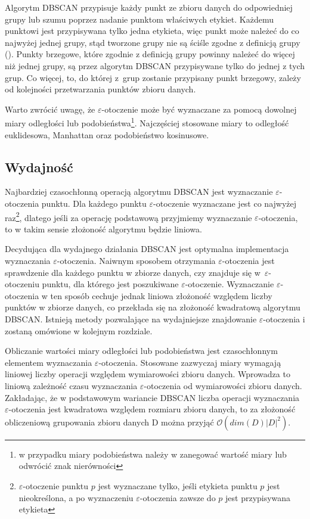 Algorytm DBSCAN przypisuje każdy punkt ze zbioru danych do odpowiedniej grupy lub szumu poprzez nadanie punktom właściwych etykiet. Każdemu punktowi jest przypisywana tylko jedna etykieta, więc punkt może należeć do co najwyżej jednej grupy, stąd tworzone grupy nie są ściśle zgodne z definicją grupy (). Punkty brzegowe, które zgodnie z definicją grupy powinny należeć do więcej niż jednej grupy, są przez algorytm DBSCAN przypisywane tylko do jednej z tych grup. Co więcej, to, do której \mbox{z grup} zostanie przypisany punkt brzegowy, zależy od kolejności przetwarzania punktów zbioru danych.

Warto zwrócić uwagę, że $ \varepsilon $-otoczenie może być wyznaczane za pomocą dowolnej miary odległości lub podobieństwa\footnote{w przypadku miary podobieństwa należy w  zanegować wartość miary lub odwrócić znak nierówności}. Najczęściej stosowane miary to odległość euklidesowa, Manhattan oraz podobieństwo kosinusowe.



\subsection{Wydajność}
Najbardziej czasochłonną operacją algorytmu DBSCAN jest wyznaczanie $ \varepsilon $-otoczenia punktu. Dla każdego punktu $ \varepsilon $-otoczenie wyznaczane jest co najwyżej raz\footnote{$ \varepsilon $-otoczenie punktu $ p $ jest wyznaczane tylko, jeśli etykieta punktu $ p $ jest nieokreślona, a  po wyznaczeniu $ \varepsilon $-otoczenia zawsze do $ p $ jest przypisywana etykieta}, dlatego jeśli za operację podstawową przyjmiemy wyznaczanie $ \varepsilon $-otoczenia, to w takim sensie złożoność algorytmu będzie liniowa.

Decydująca dla wydajnego działania DBSCAN jest optymalna implementacja wyznaczania $ \varepsilon $-otoczenia. Naiwnym sposobem otrzymania $ \varepsilon $-otoczenia jest sprawdzenie dla każdego punktu w zbiorze danych, czy znajduje się \mbox{w $ \varepsilon $-otoczeniu} punktu, dla którego jest poszukiwane $ \varepsilon $-otoczenie. Wyznaczanie $ \varepsilon $-otoczenia w ten sposób cechuje jednak liniowa złożoność względem liczby punktów w zbiorze danych, co przekłada się na złożoność kwadratową algorytmu DBSCAN. Istnieją metody pozwalające na wydajniejsze znajdowanie $ \varepsilon $-otoczenia i zostaną omówione w kolejnym rozdziale.

Obliczanie wartości miary odległości lub podobieństwa jest czasochłonnym elementem wyznaczania $ \varepsilon $-otoczenia. Stosowane zazwyczaj miary wymagają liniowej liczby operacji względem wymiarowości zbioru danych. Wprowadza to liniową zależność czasu wyznaczania $ \varepsilon $-otoczenia od wymiarowości zbioru danych. Zakładając, że w podstawowym wariancie DBSCAN liczba operacji wyznaczania $ \varepsilon $-otoczenia jest kwadratowa względem rozmiaru zbioru danych, to za złożoność obliczeniową grupowania zbioru danych D można przyjąć $ \mathcal{O}(dim(D)|D|^2) $.